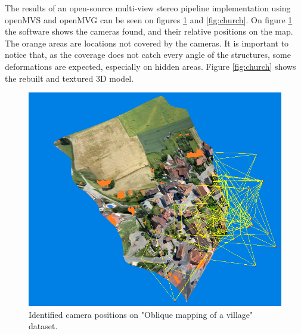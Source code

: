 The results of an open-source multi-view stereo pipeline implementation using openMVS\cite{openmvs} and openMVG\cite{openmvg} can be seen on figures \ref{fig:cameras} and \ref{fig:church}. 
%
On figure \ref{fig:cameras} the software shows the cameras found, and their relative positions on the map. 
%
The orange areas are locations not covered by the cameras. 
%
It is important to notice that, as the coverage does not catch every angle of the structures, some deformations are expected, especially on hidden areas. 
%
Figure \ref{fig:church} shows the rebuilt and textured 3D model.
 
 \begin{figure}
\centering
  \includegraphics[width=\linewidth]{figs/cameras.png}
  \caption{Identified camera positions on "Oblique mapping of a village" dataset\cite{datasets}. }
  \label{fig:cameras}
\end{figure}


